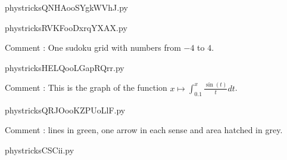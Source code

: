     \clearpage
    


    \newcommand{\CaptionFigQNHAooSYgkWVhJ}{<+Type your caption here+>}
    \begin{center}
        
    \end{center}
    phystricksQNHAooSYgkWVhJ.py

    

    \clearpage
    


    \newcommand{\CaptionFigRVKFooDxrqYXAX}{<+Type your caption here+>}
    \begin{center}
        
    \end{center}
    phystricksRVKFooDxrqYXAX.py

    Comment : One sudoku grid with numbers from $-4$ to $4$.

    \clearpage
    


    \newcommand{\CaptionFigHELQooLGapRQrr}{<+Type your caption here+>}
    \begin{center}
        
    \end{center}
    phystricksHELQooLGapRQrr.py

    Comment : This is the graph of the function $ x\mapsto  \int_{0.1}^x\frac{ \sin(t) }{ t } dt$.

    \clearpage
    


    \newcommand{\CaptionFigQRJOooKZPUoLlF}{<+Type your caption here+>}
    \begin{center}
        
    \end{center}
    phystricksQRJOooKZPUoLlF.py

    Comment : lines in green, one arrow in each sense and area hatched in grey.

    \clearpage
    


    \newcommand{\CaptionFigCSCii}{<+Type your caption here+>}
    \begin{center}
        
    \end{center}
    phystricksCSCii.py


